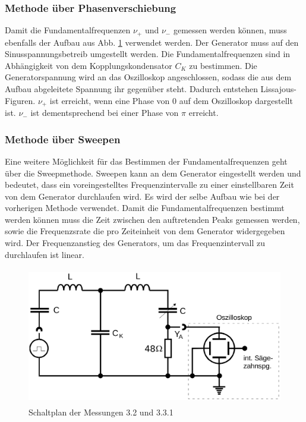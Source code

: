 \subsubsection{Methode über Phasenverschiebung}

Damit die Fundamentalfrequenzen $\nu_+$ und $\nu_-$ gemessen werden können, muss
ebenfalls der Aufbau aus Abb. \ref{Schaltplan} verwendet werden. Der Generator muss auf den
Sinusspannungsbetreib umgestellt werden. Die Fundamentalfrequenzen sind in Abhängigkeit
von dem Kopplungskondensator $C_K$ zu bestimmen. Die Generatorspannung wird an das
Oszilloskop angeschlossen, sodass die aus dem Aufbau abgeleitete Spannung ihr
gegenüber steht. Dadurch entstehen Lissajous-Figuren. $\nu_+$ ist erreicht, wenn
eine Phase von $0$ auf dem Oszilloskop dargestellt ist. $\nu_-$ ist dementsprechend
bei einer Phase von $\pi$ erreicht.

\subsubsection{Methode über Sweepen}

Eine weitere Möglichkeit für das Bestimmen der Fundamentalfrequenzen geht über die
Sweepmethode.
Sweepen kann an dem Generator eingestellt werden und bedeutet, dass ein voreingestelltes
Frequenzintervalle zu einer einstellbaren Zeit von dem Generator durchlaufen wird.
Es wird der selbe Aufbau wie bei der vorherigen Methode verwendet.
Damit die Fundamentalfrequenzen bestimmt werden können muss die Zeit zwischen den
auftretenden Peaks gemessen werden, sowie die Frequenzsrate die pro Zeiteinheit
von dem Generator widergegeben wird. Der Frequenzanstieg des Generators, um das
Frequenzintervall zu durchlaufen ist linear.

\begin{figure}
  \includegraphics[width = \textwidth, height = 6cm]{aufbau_schwebung.png}
  \caption{Schaltplan der Messungen 3.2 und 3.3.1}
  \label{Schaltplan}
\end{figure}
